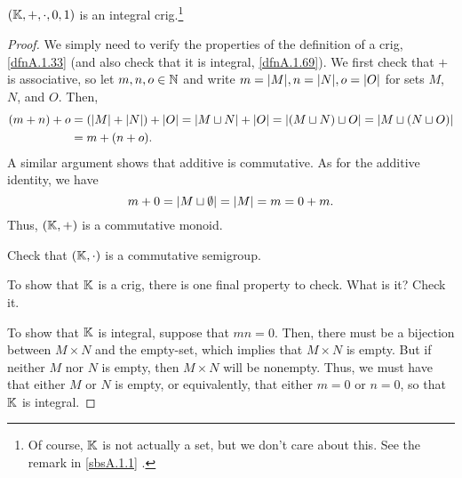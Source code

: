 \begin{prp}\label{prpA.1.16}
\begin{savenotes}
$(\mathbb{K} ,+,\cdot ,0,1)$ is an integral crig.\footnote{Of course, $\mathbb{K}$ is not actually a set, but we don't care about this.  See the remark in \cref{sbsA.1.1} .}
\begin{proof}
We simply need to verify the properties of the definition of a crig, \cref{dfnA.1.33} (and also check that it is integral, \cref{dfnA.1.69}).  We first check that $+$ is associative, so let $m,n,o\in \mathbb{N}$ and write $m=\lvert M\rvert,n=\lvert N\rvert,o=\lvert O\rvert$ for sets $M$, $N$, and $O$.  Then,
\begin{equation}
\begin{split}
(m+n)+o & =\left( \lvert M\rvert+\lvert N\rvert\right) +\lvert O\rvert=\lvert M\sqcup N\rvert+\lvert O\rvert=\lvert(M\sqcup N)\sqcup O\rvert=\lvert M\sqcup (N\sqcup O)\rvert \\
& =m+(n+o).
\end{split}
\end{equation}
A similar argument shows that additive is commutative.  As for the additive identity, we have
\begin{equation}
m+0=\lvert M\sqcup \emptyset\rvert=\lvert M\rvert=m=0+m.
\end{equation}
Thus, $(\mathbb{K} ,+)$ is a commutative monoid.

\begin{exr}
Check that $(\mathbb{K} ,\cdot )$ is a commutative semigroup.
\end{exr}
\begin{exr}
To show that $\mathbb{K}$ is a crig, there is one final property to check.  What is it?  Check it.
\end{exr}

To show that $\mathbb{K}$ is integral, suppose that $mn=0$.  Then, there must be a bijection between $M\times N$ and the empty-set, which implies that $M\times N$ is empty.  But if neither $M$ nor $N$ is empty, then $M\times N$ will be nonempty.  Thus, we must have that either $M$ or $N$ is empty, or equivalently, that either $m=0$ or $n=0$, so that $\mathbb{K}$ is integral.
\end{proof}
\end{savenotes}
\end{prp}


